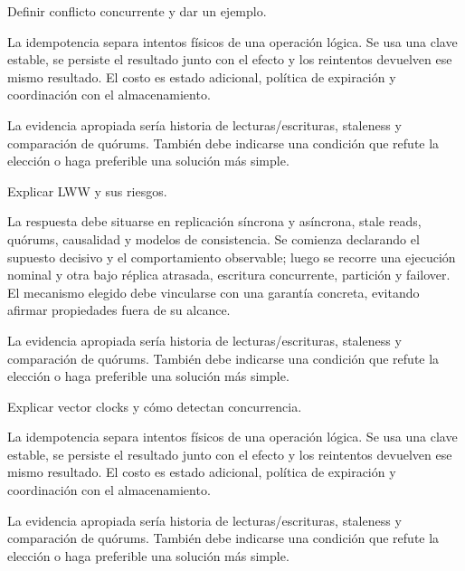 \documentclass[variant=guia,cover=institutional,mode=screen]{ua-engineering-v6-article}
\begin{document}
\begin{uaexercise}
Definir conflicto concurrente y dar un ejemplo.
\end{uaexercise}
\begin{uaanswer}
La idempotencia separa intentos físicos de una operación lógica. Se usa una clave estable, se persiste el resultado junto con el efecto y los reintentos devuelven ese mismo resultado. El costo es estado adicional, política de expiración y coordinación con el almacenamiento.

La evidencia apropiada sería historia de lecturas/escrituras, staleness y comparación de quórums. También debe indicarse una condición que refute la elección o haga preferible una solución más simple.
\end{uaanswer}

\begin{uaexercise}
Explicar LWW y sus riesgos.
\end{uaexercise}
\begin{uaanswer}
La respuesta debe situarse en replicación síncrona y asíncrona, stale reads, quórums, causalidad y modelos de consistencia. Se comienza declarando el supuesto decisivo y el comportamiento observable; luego se recorre una ejecución nominal y otra bajo réplica atrasada, escritura concurrente, partición y failover. El mecanismo elegido debe vincularse con una garantía concreta, evitando afirmar propiedades fuera de su alcance.

La evidencia apropiada sería historia de lecturas/escrituras, staleness y comparación de quórums. También debe indicarse una condición que refute la elección o haga preferible una solución más simple.
\end{uaanswer}

\begin{uaexercise}
Explicar vector clocks y cómo detectan concurrencia.
\end{uaexercise}
\begin{uaanswer}
La idempotencia separa intentos físicos de una operación lógica. Se usa una clave estable, se persiste el resultado junto con el efecto y los reintentos devuelven ese mismo resultado. El costo es estado adicional, política de expiración y coordinación con el almacenamiento.

La evidencia apropiada sería historia de lecturas/escrituras, staleness y comparación de quórums. También debe indicarse una condición que refute la elección o haga preferible una solución más simple.
\end{uaanswer}
\end{document}
